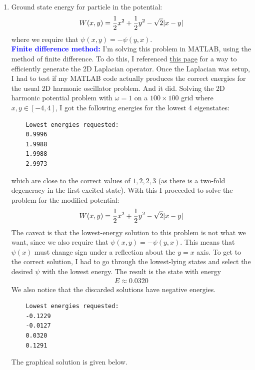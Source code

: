\documentclass{article}
\theoremstyle{definition}
\newcommand{\f}[2]{\frac{#1}{#2}}
\begin{document}
\begin{enumerate}[label=(\alph*)]
	
	
	
	
	\item Ground state energy for particle in the potential:
	\begin{align*}
	W(x,y) = \f{1}{2}x^2 + \f{1}{2}y^2 - \sqrt{2}\abs{x-y}
	\end{align*}
	where we require that $\psi(x,y) = -\psi(y,x)$. \\
	
	
	\textbf{\textcolor{blue}{Finite difference method:}} I'm solving this problem in MATLAB, using the method of finite difference. To do this, I referenced \href{https://www.mathworks.com/matlabcentral/fileexchange/69885-q_schrodinger2d_demo}{{this page}} for a way to efficiently generate the 2D Laplacian operator. Once the Laplacian was setup, I had to test if my MATLAB code actually produces the correct energies for the usual 2D harmonic oscillator problem. And it did. Solving the 2D harmonic potential problem with $\omega = 1$ on a $100\times 100$ grid where $x,y\in [-4,4]$, I got the following energies for the lowest 4 eigenstates:
	\begin{lstlisting}
	Lowest energies requested: 
	0.9996
	1.9988
	1.9988
	2.9973
	\end{lstlisting}
	which are close to the correct values of $1,2,2,3$ (as there is a two-fold degeneracy in the first excited state). With this I proceeded to solve the problem for the modified potential:
	\begin{align*}
	W(x,y) = \f{1}{2}x^2 + \f{1}{2}y^2 - \sqrt{2}\abs{x-y}
	\end{align*}
	The caveat is that the lowest-energy solution to this problem is not what we want, since we also require that $\psi(x,y) = -\psi(y,x)$. This means that $\psi(x)$ must change sign under a reflection about the $y=x$ axis. To get to the correct solution, I had to go through the lowest-lying states and select the desired $\psi$ with the lowest energy. The result is the state with energy 
	\begin{align*}
	\boxed{E \approx 0.0320}
	\end{align*}
	We also notice that the discarded solutions have negative energies. 
	\begin{lstlisting}
	Lowest energies requested: 
	-0.1229
	-0.0127
	0.0320
	0.1291
	\end{lstlisting}
	
	The graphical solution is given below.
	

\end{enumerate}
\end{document}

